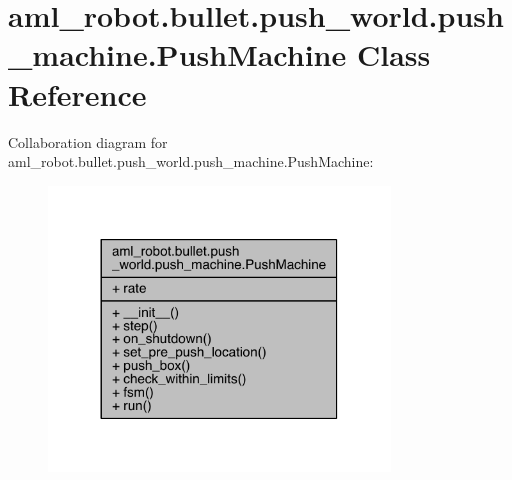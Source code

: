 \hypertarget{classaml__robot_1_1bullet_1_1push__world_1_1push__machine_1_1_push_machine}{}\section{aml\+\_\+robot.\+bullet.\+push\+\_\+world.\+push\+\_\+machine.\+Push\+Machine Class Reference}
\label{classaml__robot_1_1bullet_1_1push__world_1_1push__machine_1_1_push_machine}


Collaboration diagram for aml\+\_\+robot.\+bullet.\+push\+\_\+world.\+push\+\_\+machine.\+Push\+Machine\+:\nopagebreak
\begin{figure}[H]
\begin{center}
\leavevmode
\includegraphics[width=257pt]{classaml__robot_1_1bullet_1_1push__world_1_1push__machine_1_1_push_machine__coll__graph}
\end{center}
\end{figure}
